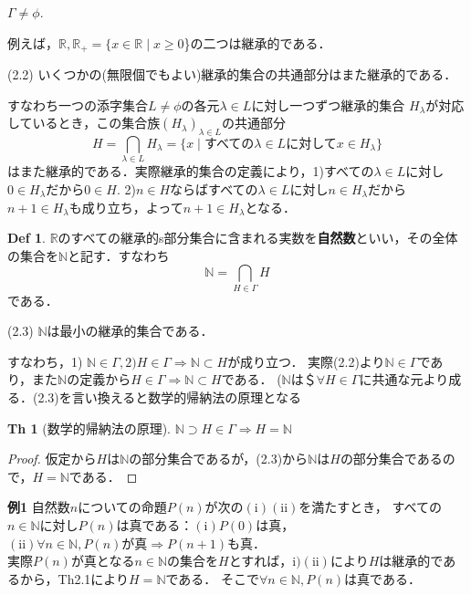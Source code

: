 \documentclass{ltjsarticle}
\theoremstyle{definition}
\newtheorem{thm}{Th}[subsection]
\newtheorem{definition}{Def}[subsection]
\theoremstyle{propcorollarystyle}
\theoremstyle{thmcorollarystyle}
\begin{document}
\hfil
$\varGamma \neq \phi$.
\hfil\par
例えば，$\mathbb{R}, \mathbb{R}_+=\{x \in \mathbb{R} \mid x \ge 0$\}の二つは継承的である．\par

(2.2) いくつかの(無限個でもよい)継承的集合の共通部分はまた継承的である．

すなわち一つの添字集合$L \neq \phi$の各元$\lambda \in L$に対し一つずつ継承的集合
$H_\lambda$が対応しているとき，この集合族$(H_\lambda)_{\lambda \in L}$の共通部分\\
\[
H=\bigcap_{\lambda \in L}H_\lambda=\{x \mid \text{すべての}\lambda \in L\text{に対して}x \in H_\lambda\}
\] 
はまた継承的である．実際継承的集合の定義により，1)すべての$\lambda \in L$に対し
$0 \in H_\lambda$だから$0 \in H$. 2)$n \in H$ならばすべての$\lambda \in L$に対し$n \in H_\lambda$だから
$n+1 \in H_\lambda$も成り立ち，よって$n+1 \in H_\lambda$となる．\\

\begin{definition}
  $\mathbb{R}$のすべての継承的s部分集合に含まれる実数を\textbf{自然数}といい，その全体の集合を$\mathbb{N}$と記す．すなわち
  \[
  \mathbb{N}=\bigcap_{H \in \varGamma}H
  \]
  である．
\end{definition}

(2.3) $\mathbb{N}$は最小の継承的集合である．

すなわち，1) $\mathbb{N} \in \varGamma, 2) H \in \varGamma \Rightarrow \mathbb{N} \subset H$が成り立つ．
実際(2.2)より$\mathbb{N} \in \varGamma$であり，また$\mathbb{N}$の定義から$H \in \varGamma \Rightarrow \mathbb{N} \subset H$である．
($\mathbb{N}$は＄$\forall H \in \varGamma$に共通な元より成る．(2.3)を言い換えると数学的帰納法の原理となる
\begin{thm}[数学的帰納法の原理]
  $\mathbb{N} \supset H \in \varGamma \Rightarrow H=\mathbb{N}$
\end{thm}
\begin{proof}
  仮定から$H$は$\mathbb{N}$の部分集合であるが，(2.3)から$\mathbb{N}$は$H$の部分集合であるので，$H=\mathbb{N}$である．
\end{proof}
 \textbf{例1} 自然数$n$についての命題$P(n)$が次の$(\mathrm{i})(\mathrm{ii})$を満たすとき，
 すべての$n \in \mathbb{N}$に対し$P(n)$は真である：$(\mathrm{i}) P(0)$は真，$(\mathrm{ii}) \forall n \in \mathbb{N}, P(n)が真 \Rightarrow P(n+1)$も真．\\
実際$P(n)$が真となる$n \in \mathbb{N}$の集合を$H$とすれば，$\mathrm{i})(\mathrm{ii})$により$H$は継承的であるから，Th2.1により$H=\mathbb{N}$である．
そこで$\forall n \in \mathbb{N}, P(n)$は真である．\\
\end{document}
